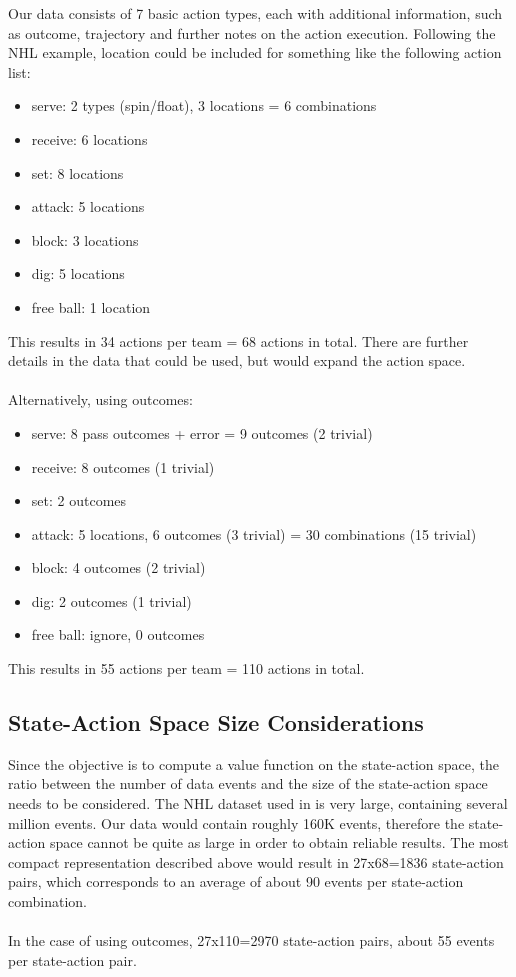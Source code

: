 \documentclass[12pt,letter]{article}
\begin{document}
	Our data consists of 7 basic action types, each with additional information, such as outcome, trajectory and further notes on the action execution. Following the NHL example, location could be included for something like the following action list:
	\begin{itemize}
		\item serve: 2 types (spin/float), 3 locations = 6 combinations
		\item receive: 6 locations
		\item set: 8 locations
		\item attack: 5 locations
		\item block: 3 locations
		\item dig: 5 locations
		\item free ball: 1 location
	\end{itemize}
	This results in 34 actions per team = 68 actions in total. There are further details in the data that could be used, but would expand the action space.
	\\\\
	Alternatively, using outcomes:
	\begin{itemize}
		\item serve: 8 pass outcomes + error = 9 outcomes (2 trivial)
		\item receive: 8 outcomes (1 trivial)
		\item set: 2 outcomes
		\item attack: 5 locations, 6 outcomes (3 trivial) = 30 combinations (15 trivial)
		\item block: 4 outcomes (2 trivial)
		\item dig: 2 outcomes (1 trivial)
		\item free ball: ignore, 0 outcomes
	\end{itemize}
	This results in 55 actions per team = 110 actions in total.
	
	\subsection*{State-Action Space Size Considerations}
	
	Since the objective is to compute a value function on the state-action space, the ratio between the number of data events and the size of the state-action space needs to be considered. The NHL dataset used in \cite{routley2015markov, schulte2017apples, schulte2017markov} is very large, containing several million events. Our data would contain roughly 160K events, therefore the state-action space cannot be quite as large in order to obtain reliable results. The most compact representation described above would result in 27x68=1836 state-action pairs, which corresponds to an average of about 90 events per state-action combination.
	\\\\
	In the case of using outcomes, 27x110=2970 state-action pairs, about 55 events per state-action pair.
	
	
	\newpage
	
	
	
\end{document}
